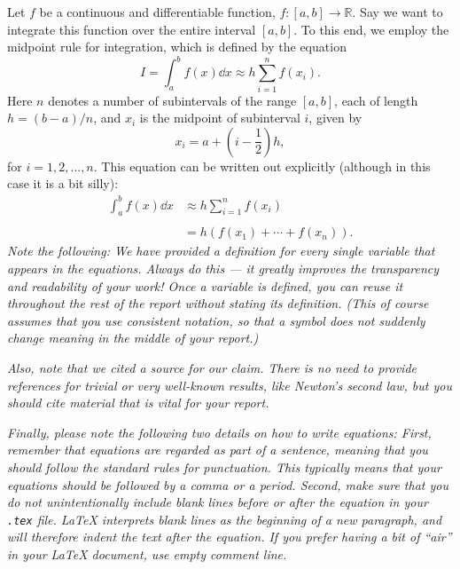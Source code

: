 \documentclass[english,notitlepage,reprint,nofootinbib]{revtex4-1}  %
\begin{document}
	Let $f$ be a continuous and differentiable function, $f: [a,b] \to \mathbb{R}$. Say we want to integrate this function over the entire interval $[a,b]$. To this end, we employ the midpoint rule for integration, which is defined by the equation~\cite{midpoint_rule}
	\begin{equation}
		I = \int_a^b f(x)\dd x \approx h\sum_{i=1}^{n} f(x_i).
	\end{equation}
	Here $n$ denotes a number of subintervals of the range $[a,b]$, each of length $h = (b-a)/n$, and $x_i$ is the midpoint of subinterval $i$, given by
	\begin{equation}
		x_i = a + \left(i-\frac{1}{2}\right) h,
	\end{equation}
	for $i = 1, 2, \ldots, n$. This equation can be written out explicitly (although in this case it is a bit silly):
	\begin{equation}
		\begin{split}
			\int_a^b f(x)\dd x & \approx h \sum_{i=1}^{n} f(x_i) \\
			\\
			& = h\left(f(x_1) + \cdots + f(x_{n})\right).
		\end{split}
	\end{equation}
	\textit{Note the following: We have provided a definition for every single variable that appears in the equations. Always do this --- it greatly improves the transparency and readability of your work! Once a variable is defined, you can reuse it throughout the rest of the report without stating its definition. (This of course assumes that you use consistent notation, so that a symbol does not suddenly change meaning in the middle of your report.)}
	
	\textit{Also, note that we cited a source for our claim. There is no need to provide references for trivial or very well-known results, like Newton's second law, but you should cite material that is vital for your report.}
	
	\textit{Finally, please note the following two details on how to write equations: First, remember that equations are regarded as part of a sentence, meaning that you should follow the standard rules for punctuation. This typically means that your equations should be followed by a comma or a period. Second, make sure that you do not unintentionally include blank lines before or after the equation in your \texttt{.tex} file. LaTeX interprets blank lines as the beginning of a new paragraph, and will therefore indent the text after the equation. If you prefer having a bit of ``air'' in your LaTeX document, use empty comment line.}
	
\end{document}
